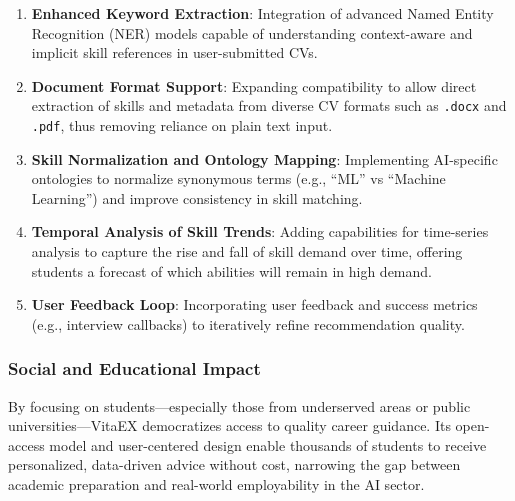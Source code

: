 \documentclass{svproc} %
\begin{document}
	\begin{enumerate}
		\item \textbf{Enhanced Keyword Extraction}: Integration of advanced Named Entity Recognition (NER) models capable of understanding context-aware and implicit skill references in user-submitted CVs.
		
		\item \textbf{Document Format Support}: Expanding compatibility to allow direct extraction of skills and metadata from diverse CV formats such as \texttt{.docx} and \texttt{.pdf}, thus removing reliance on plain text input.
		
		\item \textbf{Skill Normalization and Ontology Mapping}: Implementing AI-specific ontologies to normalize synonymous terms (e.g., “ML” vs “Machine Learning”) and improve consistency in skill matching.
		
		\item \textbf{Temporal Analysis of Skill Trends}: Adding capabilities for time-series analysis to capture the rise and fall of skill demand over time, offering students a forecast of which abilities will remain in high demand.
		
		\item \textbf{User Feedback Loop}: Incorporating user feedback and success metrics (e.g., interview callbacks) to iteratively refine recommendation quality.
	\end{enumerate}
	
	\subsubsection{Social and Educational Impact}
	
	By focusing on students—especially those from underserved areas or public universities—VitaEX democratizes access to quality career guidance. Its open-access model and user-centered design enable thousands of students to receive personalized, data-driven advice without cost, narrowing the gap between academic preparation and real-world employability in the AI sector.
	
\makeatletter
\renewcommand\@biblabel[1]{#1.}  %
\renewcommand\bibsection{\section*{References}\vspace*{-0.5em}} %
\makeatother

	
	
\end{document}
